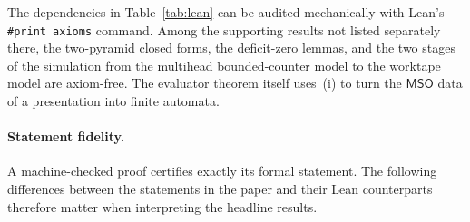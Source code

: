 \documentclass[11pt]{article}
\theoremstyle{definition}
\newcommand{\MSO}{\mathsf{MSO}}
\begin{document}
The dependencies in Table~\ref{tab:lean} can be audited mechanically with
Lean's \texttt{\#print axioms} command.  Among the supporting results not
listed separately there, the two-pyramid closed forms, the deficit-zero lemmas,
and the two stages of the simulation from the multihead bounded-counter model
to the worktape model are axiom-free.  The evaluator theorem itself uses~(i) to
turn the $\MSO$ data of a presentation into finite automata.

\paragraph{Statement fidelity.}
A machine-checked proof certifies exactly its formal statement.  The following
differences between the statements in the paper and their Lean counterparts
therefore matter when interpreting the headline results.
\end{document}
